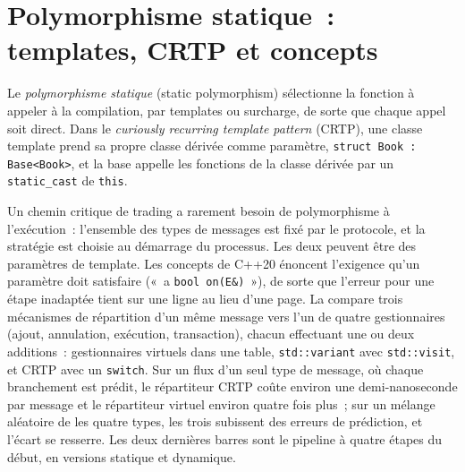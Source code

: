 \section{Polymorphisme statique~: templates, CRTP et concepts}

\begin{definition}\label{def:ll:cpp-for-latency-ii-compile-time:static}
Le \emph{polymorphisme statique} (static polymorphism) sélectionne la fonction à appeler à la compilation, par templates ou
surcharge, de sorte que chaque appel soit direct. Dans le
\emph{curiously recurring template pattern} (CRTP), une classe template prend sa propre classe dérivée comme paramètre, \texttt{struct Book : Base<Book>},
et la base appelle les fonctions de la classe dérivée par un \texttt{static\_cast} de \texttt{this}.
\end{definition}

Un chemin critique de trading a rarement besoin de polymorphisme à l'exécution~: l'ensemble des types de messages est fixé par le protocole, et la stratégie
est choisie au démarrage du processus. Les deux peuvent être des paramètres de template. Les concepts de C++20 énoncent l'exigence qu'un paramètre doit
satisfaire («~a \texttt{bool on(E\&)}~»), de sorte que l'erreur pour une étape inadaptée tient sur une ligne au lieu d'une page.
La  compare trois mécanismes de répartition d'un même message vers l'un de quatre gestionnaires
(ajout, annulation, exécution, transaction), chacun effectuant une ou deux additions~: gestionnaires virtuels dans une table, \texttt{std::variant} avec
\texttt{std::visit}, et CRTP avec un \texttt{switch}. Sur un flux d'un seul type de message, où chaque branchement est prédit, le
répartiteur CRTP coûte environ une demi-nanoseconde par message et le répartiteur virtuel environ quatre fois plus~; sur un mélange aléatoire de
les quatre types, les trois subissent des erreurs de prédiction, et l'écart se resserre. Les deux dernières barres sont le pipeline à quatre étapes du
début, en versions statique et dynamique.

